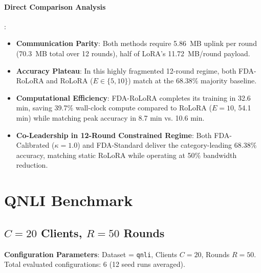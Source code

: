 \documentclass[10pt,a4paper]{article}
\begin{document}
\paragraph{Direct Comparison Analysis}:
\begin{itemize}
    \item \textbf{Communication Parity}: Both methods require 5.86~MB uplink per round (70.3~MB total over 12 rounds), half of LoRA's 11.72~MB/round payload.
    \item \textbf{Accuracy Plateau}: In this highly fragmented 12-round regime, both FDA-RoLoRA and RoLoRA ($E \in \{5, 10\}$) match at the 68.38\% majority baseline.
    \item \textbf{Computational Efficiency}: FDA-RoLoRA completes its training in 32.6 min, saving 39.7\% wall-clock compute compared to RoLoRA ($E=10$, 54.1 min) while matching peak accuracy in 8.7 min vs. 10.6 min.
    \item \textbf{Co-Leadership in 12-Round Constrained Regime}: Both FDA-Calibrated ($\kappa=1.0$) and FDA-Standard deliver the category-leading $68.38\%$ accuracy, matching static RoLoRA while operating at 50\% bandwidth reduction.
\end{itemize}

\clearpage


\clearpage
\section{QNLI Benchmark}
\subsection{\texorpdfstring{$C=20$ Clients, $R=50$ Rounds}{C=20 Clients, R=50 Rounds}}

\textbf{Configuration Parameters}: Dataset = \texttt{qnli}, Clients $C = 20$, Rounds $R = 50$. Total evaluated configurations: 6 (12 seed runs averaged).
\end{document}
